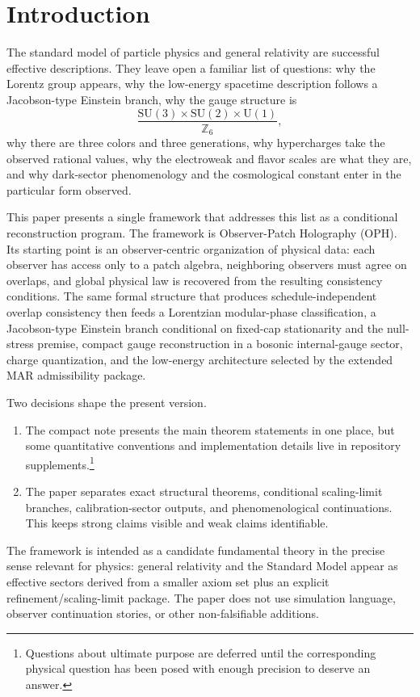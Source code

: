 \documentclass[11pt]{article}
\newcommand{\SU}{\mathrm{SU}}
\newcommand{\U}{\mathrm{U}}
\begin{document}
\section{Introduction}

The standard model of particle physics and general relativity are successful effective descriptions. They leave open a familiar list of questions: why the Lorentz group appears, why the low-energy spacetime description follows a Jacobson-type Einstein branch, why the gauge structure is
\[
\frac{\SU(3)\times\SU(2)\times\U(1)}{\mathbb Z_6},
\]
why there are three colors and three generations, why hypercharges take the observed rational values, why the electroweak and flavor scales are what they are, and why dark-sector phenomenology and the cosmological constant enter in the particular form observed.

This paper presents a single framework that addresses this list as a conditional reconstruction program. The framework is Observer-Patch Holography (OPH). Its starting point is an observer-centric organization of physical data: each observer has access only to a patch algebra, neighboring observers must agree on overlaps, and global physical law is recovered from the resulting consistency conditions. The same formal structure that produces schedule-independent overlap consistency then feeds a Lorentzian modular-phase classification, a Jacobson-type Einstein branch conditional on fixed-cap stationarity and the null-stress premise, compact gauge reconstruction in a bosonic internal-gauge sector, charge quantization, and the low-energy architecture selected by the extended MAR admissibility package.

Two decisions shape the present version.

\begin{enumerate}[leftmargin=2em]
\item The compact note presents the main theorem statements in one place, but some quantitative conventions and implementation details live in repository supplements.\footnote{Questions about ultimate purpose are deferred until the corresponding physical question has been posed with enough precision to deserve an answer.}
\item The paper separates exact structural theorems, conditional scaling-limit branches, calibration-sector outputs, and phenomenological continuations. This keeps strong claims visible and weak claims identifiable.
\end{enumerate}

The framework is intended as a candidate fundamental theory in the precise sense relevant for physics: general relativity and the Standard Model appear as effective sectors derived from a smaller axiom set plus an explicit refinement/scaling-limit package. The paper does not use simulation language, observer continuation stories, or other non-falsifiable additions.
\end{document}
